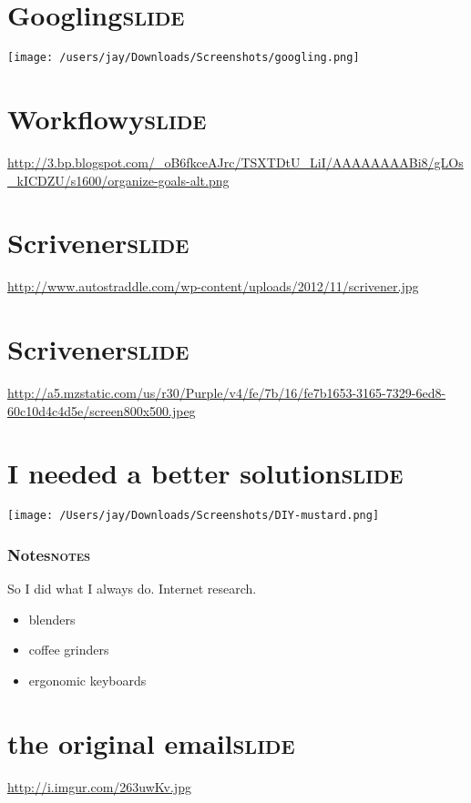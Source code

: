 \documentclass[11pt]{article}
\begin{document}
\section{Googling\hfill{}\textsc{slide}}
\label{sec:orgheadline13}
\texttt{[image: /users/jay/Downloads/Screenshots/googling.png]} 

\section{Workflowy\hfill{}\textsc{slide}}
\label{sec:orgheadline14}
\url{http://3.bp.blogspot.com/_oB6fkceAJrc/TSXTDtU_LiI/AAAAAAAABi8/gLOs_kICDZU/s1600/organize-goals-alt.png} 

\section{Scrivener\hfill{}\textsc{slide}}
\label{sec:orgheadline15}
\url{http://www.autostraddle.com/wp-content/uploads/2012/11/scrivener.jpg} 

\section{Scrivener\hfill{}\textsc{slide}}
\label{sec:orgheadline16}
\url{http://a5.mzstatic.com/us/r30/Purple/v4/fe/7b/16/fe7b1653-3165-7329-6ed8-60c10d4c4d5e/screen800x500.jpeg} 

\section{I needed a better solution\hfill{}\textsc{slide}}
\label{sec:orgheadline18}
\texttt{[image: /Users/jay/Downloads/Screenshots/DIY-mustard.png]} 

\subsubsection{Notes\hfill{}\textsc{notes}}
\label{sec:orgheadline17}
So I did what I always do. Internet research.
\begin{itemize}
\item blenders
\item coffee grinders
\item ergonomic keyboards
\end{itemize}

\section{the original email\hfill{}\textsc{slide}}
\label{sec:orgheadline20}
\url{http://i.imgur.com/263uwKv.jpg} 
\end{document}
